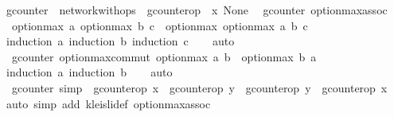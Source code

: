 \begin{isabellebody}
\isamarkupfalse%
\ gcounter\ {\isacharequal}\ network{\isacharunderscore}with{\isacharunderscore}ops\ {\isacharunderscore}\ gcounter{\isacharunderscore}op\ {\isachardoublequoteopen}{\isasymlambda}\ x{\isachardot}\ None{\isachardoublequoteclose}\isanewline
\isanewline
{}\isamarkupfalse%
\ {\isacharparenleft}\ gcounter{\isacharparenright}\ option{\isacharunderscore}max{\isacharunderscore}assoc{\isacharcolon}\isanewline
\ \ {\isachardoublequoteopen}option{\isacharunderscore}max\ a\ {\isacharparenleft}option{\isacharunderscore}max\ b\ c{\isacharparenright}\ {\isacharequal}\ option{\isacharunderscore}max\ {\isacharparenleft}option{\isacharunderscore}max\ a\ b{\isacharparenright}\ c{\isachardoublequoteclose}\isanewline
%
\isadelimproof
\ \ %
\endisadelimproof
%
\isatagproof
{}\isamarkupfalse%
\ {\isacharparenleft}induction\ a{\isacharsemicolon}\ induction\ b{\isacharsemicolon}\ induction\ c{\isacharparenright}\isanewline
\ \ \isamarkupfalse%
\ {\isacharparenleft}auto{\isacharparenright}\isanewline
\ \ \isamarkupfalse%
%
\endisatagproof
{\isafoldproof}%
%
\isadelimproof
\isanewline
%
\endisadelimproof
\isanewline
{}\isamarkupfalse%
\ {\isacharparenleft}\ gcounter{\isacharparenright}\ option{\isacharunderscore}max{\isacharunderscore}commut{\isacharcolon}\ {\isachardoublequoteopen}option{\isacharunderscore}max\ a\ b\ {\isacharequal}\ option{\isacharunderscore}max\ b\ a{\isachardoublequoteclose}\isanewline
%
\isadelimproof
\ \ %
\endisadelimproof
%
\isatagproof
{}\isamarkupfalse%
\ {\isacharparenleft}induction\ a{\isacharsemicolon}\ induction\ b{\isacharparenright}\isanewline
\ \ \isamarkupfalse%
\ {\isacharparenleft}auto{\isacharparenright}\isanewline
\ \ \isamarkupfalse%
%
\endisatagproof
{\isafoldproof}%
%
\isadelimproof
\isanewline
%
\endisadelimproof
\isanewline
{}\isamarkupfalse%
\ {\isacharparenleft}\ gcounter{\isacharparenright}\ {\isacharbrackleft}simp{\isacharbrackright}\ {\isacharcolon}\ {\isachardoublequoteopen}gcounter{\isacharunderscore}op\ x\ {\isasymrhd}\ gcounter{\isacharunderscore}op\ y\ {\isacharequal}\ gcounter{\isacharunderscore}op\ y\ {\isasymrhd}\ gcounter{\isacharunderscore}op\ x{\isachardoublequoteclose}\isanewline
%
\isadelimproof
\ \ %
\endisadelimproof
%
\isatagproof
{}\isamarkupfalse%
\ {\isacharparenleft}auto\ simp\ add{\isacharcolon}\ kleisli{\isacharunderscore}def\ option{\isacharunderscore}max{\isacharunderscore}assoc{\isacharparenright}\isanewline

\end{isabellebody}
